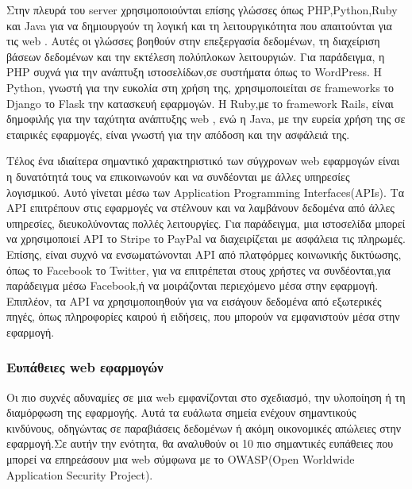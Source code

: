 Στην πλευρά του server χρησιμοποιούνται επίσης γλώσσες όπως \lt PHP,Python,Ruby \gt και \lt Java \gt  για να δημιουργούν τη λογική και τη λειτουργικότητα που απαιτούνται για τις \lt web . Αυτές οι γλώσσες βοηθούν στην επεξεργασία δεδομένων, τη διαχείριση βάσεων δεδομένων και την εκτέλεση πολύπλοκων λειτουργιών. Για παράδειγμα, η \lt PHP  συχνά για την ανάπτυξη ιστοσελίδων,σε συστήματα όπως το \lt WordPress\gt. Η \lt Python\gt, γνωστή για την ευκολία στη χρήση της, χρησιμοποιείται σε \lt frameworks  το \lt Django  το \lt Flask  την κατασκευή εφαρμογών. Η \lt Ruby,\gt με το \lt framework Rails\gt, είναι δημοφιλής για την ταχύτητα ανάπτυξης \lt web , ενώ η \lt Java\gt, με την ευρεία χρήση της σε εταιρικές εφαρμογές, είναι γνωστή για την απόδοση και την ασφάλειά της.

Τέλος ένα ιδιαίτερα σημαντικό χαρακτηριστικό των σύγχρονων \lt web \gt εφαρμογών είναι η δυνατότητά τους να επικοινωνούν και να συνδέονται με άλλες υπηρεσίες λογισμικού. Αυτό γίνεται μέσω των \lt Application Programming Interfaces(APIs)\gt. Τα \lt API \gt επιτρέπουν στις εφαρμογές να στέλνουν και να λαμβάνουν δεδομένα από άλλες υπηρεσίες, διευκολύνοντας πολλές λειτουργίες. Για παράδειγμα, μια ιστοσελίδα μπορεί να χρησιμοποιεί \lt API  το \lt Stripe  το \lt PayPal  να διαχειρίζεται με ασφάλεια τις πληρωμές. Επίσης, είναι συχνό να ενσωματώνονται API από πλατφόρμες κοινωνικής δικτύωσης, όπως το \lt Facebook  το \lt Twitter\gt, για να επιτρέπεται στους χρήστες να συνδέονται,για παράδειγμα μέσω \lt Facebook,\gt ή να μοιράζονται περιεχόμενο μέσα στην εφαρμογή. Επιπλέον, τα \lt API  να χρησιμοποιηθούν για να εισάγουν δεδομένα από εξωτερικές πηγές, όπως πληροφορίες καιρού ή ειδήσεις, που μπορούν να εμφανιστούν μέσα στην εφαρμογή.

\subsubsection{Ευπάθειες \lt web \gt εφαρμογών}

Οι πιο συχνές αδυναμίες σε μια \lt web  εμφανίζονται στο σχεδιασμό, την υλοποίηση ή τη διαμόρφωση της  εφαρμογής. Αυτά τα ευάλωτα σημεία ενέχουν σημαντικούς κινδύνους, οδηγώντας σε παραβιάσεις δεδομένων ή ακόμη οικονομικές απώλειες στην εφαρμογή.Σε αυτήν την ενότητα, θα αναλυθούν οι 10 πιο σημαντικές ευπάθειες που μπορεί να επηρεάσουν μια \lt web  σύμφωνα με το \lt OWASP(Open Worldwide Application Security Project).\gt

